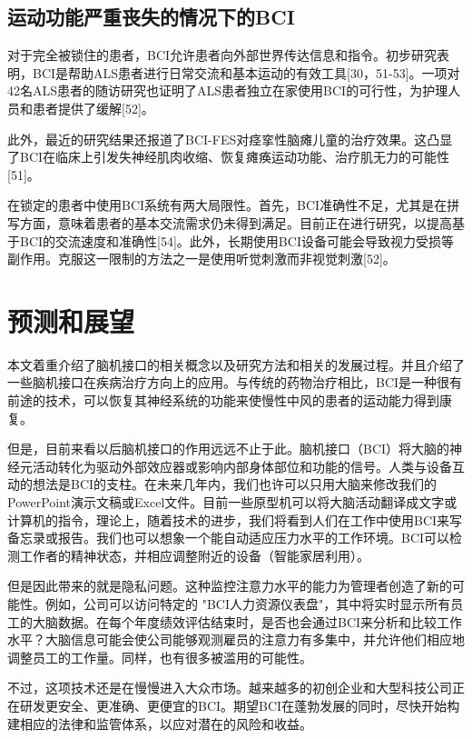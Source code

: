 \documentclass[UTF8,a4paper]{ctexart}
\begin{document}
\subsection{运动功能严重丧失的情况下的BCI}
对于完全被锁住的患者，BCI允许患者向外部世界传达信息和指令。初步研究表明，BCI是帮助ALS患者进行日常交流和基本运动的有效工具[30，51-53]。一项对42名ALS患者的随访研究也证明了ALS患者独立在家使用BCI的可行性，为护理人员和患者提供了缓解[52]。
\par 
此外，最近的研究结果还报道了BCI-FES对痉挛性脑瘫儿童的治疗效果。这凸显了BCI在临床上引发失神经肌肉收缩、恢复瘫痪运动功能、治疗肌无力的可能性[51]。
\par
在锁定的患者中使用BCI系统有两大局限性。首先，BCI准确性不足，尤其是在拼写方面，意味着患者的基本交流需求仍未得到满足。目前正在进行研究，以提高基于BCI的交流速度和准确性[54]。此外，长期使用BCI设备可能会导致视力受损等副作用。克服这一限制的方法之一是使用听觉刺激而非视觉刺激[52]。

\section{预测和展望}
本文着重介绍了脑机接口的相关概念以及研究方法和相关的发展过程。并且介绍了一些脑机接口在疾病治疗方向上的应用。与传统的药物治疗相比，BCI是一种很有前途的技术，可以恢复其神经系统的功能来使慢性中风的患者的运动能力得到康复。
\par 
但是，目前来看以后脑机接口的作用远远不止于此。脑机接口（BCI）将大脑的神经元活动转化为驱动外部效应器或影响内部身体部位和功能的信号。人类与设备互动的想法是BCI的支柱。在未来几年内，我们也许可以只用大脑来修改我们的PowerPoint演示文稿或Excel文件。目前一些原型机可以将大脑活动翻译成文字或计算机的指令，理论上，随着技术的进步，我们将看到人们在工作中使用BCI来写备忘录或报告。我们也可以想象一个能自动适应压力水平的工作环境。BCI可以检测工作者的精神状态，并相应调整附近的设备（智能家居利用）。
\par
但是因此带来的就是隐私问题。这种监控注意力水平的能力为管理者创造了新的可能性。例如，公司可以访问特定的 "BCI人力资源仪表盘"，其中将实时显示所有员工的大脑数据。在每个年度绩效评估结束时，是否也会通过BCI来分析和比较工作水平？大脑信息可能会使公司能够观测雇员的注意力有多集中，并允许他们相应地调整员工的工作量。同样，也有很多被滥用的可能性。
\par
不过，这项技术还是在慢慢进入大众市场。越来越多的初创企业和大型科技公司正在研发更安全、更准确、更便宜的BCI。期望BCI在蓬勃发展的同时，尽快开始构建相应的法律和监管体系，以应对潜在的风险和收益。


\renewcommand{\refname}{参考文献}


\clearpage
\end{document}

